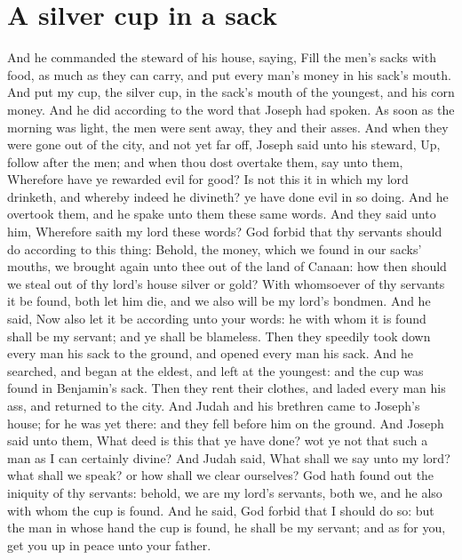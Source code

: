 \section*{A silver cup in a sack}
\begin{biblechapter} %
\verse And he commanded the steward of his house, saying, Fill the men's sacks with food, as much as they can carry, and put every man's money in his sack's mouth.
\verse And put my cup, the silver cup, in the sack's mouth of the youngest, and his corn money. And he did according to the word that Joseph had spoken.
\verse As soon as the morning was light, the men were sent away, they and their asses.
\verse And when they were gone out of the city, and not yet far off, Joseph said unto his steward, Up, follow after the men; and when thou dost overtake them, say unto them, Wherefore have ye rewarded evil for good?
\verse Is not this it in which my lord drinketh, and whereby indeed he divineth? ye have done evil in so doing.
\verse And he overtook them, and he spake unto them these same words.
\verse And they said unto him, Wherefore saith my lord these words? God forbid that thy servants should do according to this thing:
\verse Behold, the money, which we found in our sacks' mouths, we brought again unto thee out of the land of Canaan: how then should we steal out of thy lord's house silver or gold?
\verse With whomsoever of thy servants it be found, both let him die, and we also will be my lord's bondmen.
\verse And he said, Now also let it be according unto your words: he with whom it is found shall be my servant; and ye shall be blameless.
\verse Then they speedily took down every man his sack to the ground, and opened every man his sack.
\verse And he searched, and began at the eldest, and left at the youngest: and the cup was found in Benjamin's sack.
\verse Then they rent their clothes, and laded every man his ass, and returned to the city.
\verse And Judah and his brethren came to Joseph's house; for he was yet there: and they fell before him on the ground.
\verse And Joseph said unto them, What deed is this that ye have done? wot ye not that such a man as I can certainly divine?
\verse And Judah said, What shall we say unto my lord? what shall we speak? or how shall we clear ourselves? God hath found out the iniquity of thy servants: behold, we are my lord's servants, both we, and he also with whom the cup is found.
\verse And he said, God forbid that I should do so: but the man in whose hand the cup is found, he shall be my servant; and as for you, get you up in peace unto your father.

\end{biblechapter}

